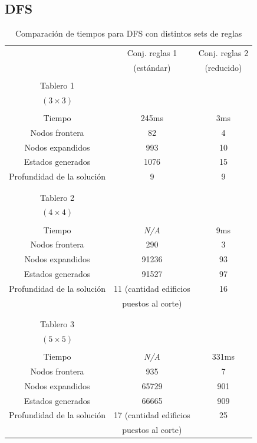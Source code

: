 \documentclass[%
    final,
    reprint,
    notitlepage,
    narroweqnarray,
    inline,
    twoside,
    invited
    ]{ieee}
\begin{document}
\subsection{DFS}

\begin{table}[H]
\begin{center}
\begin{tabular}{|c|c|c|}
\hline
 & Conj. reglas 1 &  Conj. reglas 2\\
 & (estándar) &  (reducido)\\

\hline
\hline

&&\\
Tablero 1 & & \\
$(3\times 3)$ & & \\
&&\\
\hline
Tiempo & 245ms & 3ms \\
\hline
Nodos frontera & 82 & 4 \\
\hline
Nodos expandidos & 993 & 10 \\
\hline
Estados generados & 1076 & 15 \\
\hline
Profundidad de la solución & 9 & 9 \\
\hline
&&\\

\hline
\hline

&&\\
Tablero 2 & & \\
$(4\times 4)$ & & \\
&&\\
\hline
Tiempo & \textit{N/A} & 9ms \\
\hline
Nodos frontera & 290 & 3 \\
\hline
Nodos expandidos & 91236 & 93 \\
\hline
Estados generados & 91527 & 97 \\
\hline
Profundidad de la solución & 11 (cantidad edificios  & 16 \\
&puestos al corte)&\\
\hline
&&\\

\hline
\hline

&&\\
Tablero 3 & & \\
$(5\times 5)$ & & \\
&&\\
\hline
Tiempo & \textit{N/A} & 331ms \\
\hline
Nodos frontera & 935 & 7 \\
\hline
Nodos expandidos & 65729 & 901 \\
\hline
Estados generados & 66665 & 909 \\
\hline
Profundidad de la solución & 17 (cantidad edificios  & 25 \\
&puestos al corte)&\\

\hline  
\end{tabular}
\end{center}
\caption{Comparación de tiempos para DFS con distintos sets de reglas}\label{tablaIDFS}
\end{table}
\end{document}
